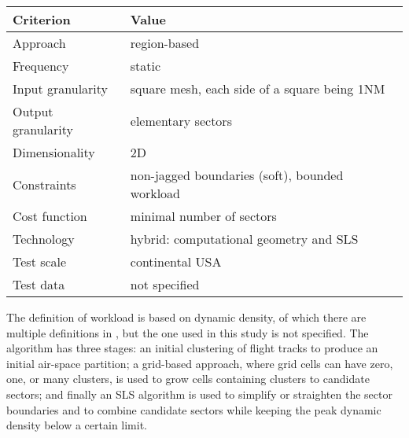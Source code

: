 \documentclass[a4paper,12pt]{article}
\begin{document}
\begin{center}
\begin{tabular}{|l|l|}
  \hline
  Criterion & Value \\
  \hline\hline
  Approach & region-based \\ \hline
  Frequency & static \\ \hline
  Input granularity & square mesh, each side of a square being 1NM \\ \hline
  Output granularity & elementary sectors \\ \hline
  Dimensionality & 2D \\ \hline
  Constraints & non-jagged boundaries (soft), bounded workload \\ \hline
  Cost function & minimal number of sectors \\ \hline
  Technology & hybrid: computational geometry and SLS \\ \hline
  Test scale & continental USA \\ \hline
  Test data & not specified \\ \hline
\end{tabular}
\end{center}
The definition of workload is based on dynamic density, of which there
are multiple definitions in \cite{Kopardekar:DASC02}, but the one used
in this study is not specified.  The algorithm has three stages: an
initial clustering of flight tracks to produce an initial air-space
partition; a grid-based approach, where grid cells can have zero, one,
or many clusters, is used to grow cells containing clusters to
candidate sectors; and finally an SLS algorithm is used to simplify or
straighten the sector boundaries and to combine candidate sectors
while keeping the peak dynamic density below a certain limit.

\subsection{\cite{Drew:ATIO09}}
\end{document}
